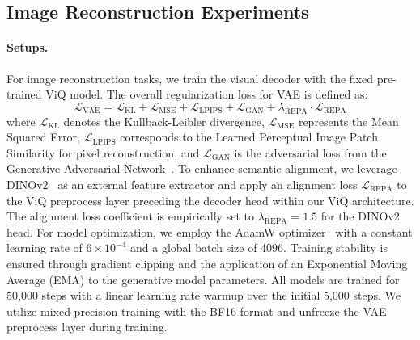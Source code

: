 \documentclass{llmxive}
\begin{document}
\subsection{Image Reconstruction Experiments}
\paragraph{Setups.} For image reconstruction tasks, we train the visual decoder with the fixed pre-trained ViQ model. The overall regularization loss for VAE is defined as:
\begin{equation}
    \mathcal{L}_{\text{VAE}} = \mathcal{L}_{\text{KL}} + \mathcal{L}_{\text{MSE}} + \mathcal{L}_{\text{LPIPS}} + \mathcal{L}_{\text{GAN}} + \lambda_{\text{REPA}} \cdot \mathcal{L}_{\text{REPA}}
\end{equation}
where $\mathcal{L}_{\text{KL}}$ denotes the Kullback-Leibler divergence, $\mathcal{L}_{\text{MSE}}$ represents the Mean Squared Error, $\mathcal{L}_{\text{LPIPS}}$ corresponds to the Learned Perceptual Image Patch Similarity for pixel reconstruction, and $\mathcal{L}_{\text{GAN}}$ is the adversarial loss from the Generative Adversarial Network~\cite{goodfellow2020generative}. To enhance semantic alignment, we leverage DINOv2~\cite{oquab2023dinov2} as an external feature extractor and apply an alignment loss $\mathcal{L}_{\text{REPA}}$ to the ViQ preprocess layer preceding the decoder head within our ViQ architecture. The alignment loss coefficient is empirically set to $\lambda_{\text{REPA}} = 1.5$ for the DINOv2 head.
For model optimization, we employ the AdamW optimizer~\cite{loshchilov2017decoupled, kingma2017adammethodstochasticoptimization} with a constant learning rate of $6\times10^{-4}$ and a global batch size of 4096. Training stability is ensured through gradient clipping and the application of an Exponential Moving Average (EMA) to the generative model parameters. All models are trained for 50,000 steps with a linear learning rate warmup over the initial 5,000 steps. We utilize mixed-precision training with the BF16 format and unfreeze the VAE preprocess layer during training.
\end{document}
